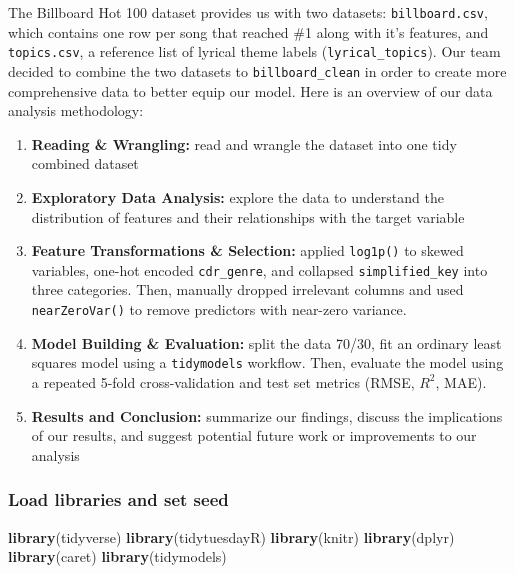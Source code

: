 \documentclass[
]{article}
\newenvironment{Shaded}{\begin{snugshade}}{\end{snugshade}}
\newcommand{\FunctionTok}[1]{\textcolor[rgb]{0.13,0.29,0.53}{\textbf{#1}}}
\newcommand{\NormalTok}[1]{#1}
\begin{document}
The Billboard Hot 100 dataset provides us with two datasets:
\texttt{billboard.csv}, which contains one row per song that reached \#1
along with it's features, and \texttt{topics.csv}, a reference list of
lyrical theme labels (\texttt{lyrical\_topics}). Our team decided to
combine the two datasets to \texttt{billboard\_clean} in order to create
more comprehensive data to better equip our model. Here is an overview
of our data analysis methodology:

\begin{enumerate}
\def\labelenumi{\arabic{enumi}.}
\item
  \textbf{Reading \& Wrangling:} read and wrangle the dataset into one
  tidy combined dataset
\item
  \textbf{Exploratory Data Analysis:} explore the data to understand the
  distribution of features and their relationships with the target
  variable
\item
  \textbf{Feature Transformations \& Selection:} applied
  \texttt{log1p()} to skewed variables, one-hot encoded
  \texttt{cdr\_genre}, and collapsed \texttt{simplified\_key} into three
  categories. Then, manually dropped irrelevant columns and used
  \texttt{nearZeroVar()} to remove predictors with near-zero variance.
\item
  \textbf{Model Building \& Evaluation:} split the data 70/30, fit an
  ordinary least squares model using a \texttt{tidymodels} workflow.
  Then, evaluate the model using a repeated 5-fold cross-validation and
  test set metrics (RMSE, \(R^2\), MAE).
\item
  \textbf{Results and Conclusion:} summarize our findings, discuss the
  implications of our results, and suggest potential future work or
  improvements to our analysis
\end{enumerate}

\subsubsection{Load libraries and set
seed}\label{load-libraries-and-set-seed}

\begin{Shaded}
\begin{Highlighting}[]
\FunctionTok{library}\NormalTok{(tidyverse)}
\FunctionTok{library}\NormalTok{(tidytuesdayR)}
\FunctionTok{library}\NormalTok{(knitr)}
\FunctionTok{library}\NormalTok{(dplyr)}
\FunctionTok{library}\NormalTok{(caret)}
\FunctionTok{library}\NormalTok{(tidymodels)}
\end{Highlighting}
\end{Shaded}
\end{document}
